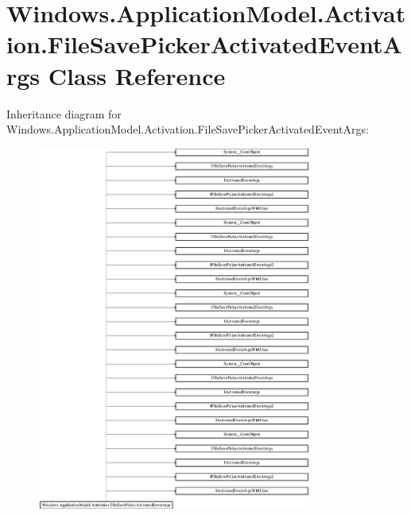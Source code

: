 \hypertarget{class_windows_1_1_application_model_1_1_activation_1_1_file_save_picker_activated_event_args}{}\section{Windows.\+Application\+Model.\+Activation.\+File\+Save\+Picker\+Activated\+Event\+Args Class Reference}
\label{class_windows_1_1_application_model_1_1_activation_1_1_file_save_picker_activated_event_args}
Inheritance diagram for Windows.\+Application\+Model.\+Activation.\+File\+Save\+Picker\+Activated\+Event\+Args\+:\begin{figure}[H]
\begin{center}
\leavevmode
\includegraphics[height=12.000000cm]{class_windows_1_1_application_model_1_1_activation_1_1_file_save_picker_activated_event_args}
\end{center}
\end{figure}
